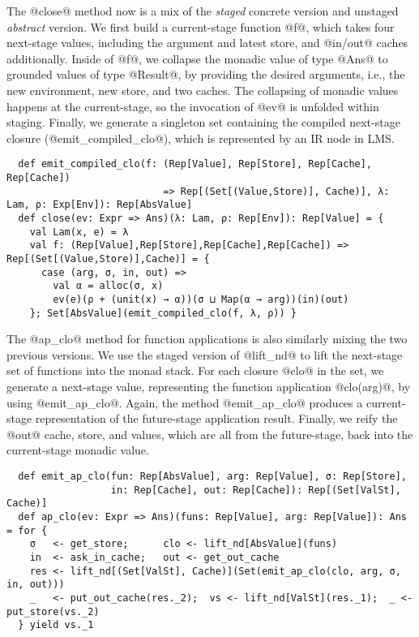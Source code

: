The @close@ method now is a mix of the \textit{staged} concrete version and
unstaged \textit{abstract} version. We first build a current-stage function @f@, which
takes four next-stage values, including the argument and latest store, and
@in/out@ caches additionally. Inside of @f@, we collapse the monadic value of
type @Ans@ to grounded values of type @Result@, by providing the desired
arguments, i.e., the new environment, new store, and two caches. The collapsing
of monadic values happens at the current-stage, so the invocation of @ev@ is unfolded
within staging. Finally, we generate a singleton set containing the compiled
next-stage closure (@emit_compiled_clo@), which is represented by an IR node
in LMS.
\begin{lstlisting}
  def emit_compiled_clo(f: (Rep[Value], Rep[Store], Rep[Cache], Rep[Cache])
                           => Rep[(Set[(Value,Store)], Cache)], λ: Lam, ρ: Exp[Env]): Rep[AbsValue]
  def close(ev: Expr => Ans)(λ: Lam, ρ: Rep[Env]): Rep[Value] = {
    val Lam(x, e) = λ
    val f: (Rep[Value],Rep[Store],Rep[Cache],Rep[Cache]) => Rep[(Set[(Value,Store)],Cache)] = {
      case (arg, σ, in, out) =>
        val α = alloc(σ, x)
        ev(e)(ρ + (unit(x) → α))(σ ⊔ Map(α → arg))(in)(out)
    }; Set[AbsValue](emit_compiled_clo(f, λ, ρ)) }
\end{lstlisting}

The @ap_clo@ method for function applications is also similarly mixing the two
previous versions.  We use the staged version of @lift_nd@ to lift the
next-stage set of functions into the monad stack.
For each closure @clo@ in the set, we generate a next-stage value, representing
the function application @clo(arg)@, by using @emit_ap_clo@.  Again, the method
@emit_ap_clo@ produces a current-stage representation of the future-stage
application result.  Finally, we reify the @out@ cache, store, and values,
which are all from the future-stage, back into the current-stage monadic value.
\begin{lstlisting}
  def emit_ap_clo(fun: Rep[AbsValue], arg: Rep[Value], σ: Rep[Store],
                  in: Rep[Cache], out: Rep[Cache]): Rep[(Set[ValSt], Cache)]
  def ap_clo(ev: Expr => Ans)(funs: Rep[Value], arg: Rep[Value]): Ans = for {
    σ   <- get_store;      clo <- lift_nd[AbsValue](funs)
    in  <- ask_in_cache;   out <- get_out_cache
    res <- lift_nd[(Set[ValSt], Cache)](Set(emit_ap_clo(clo, arg, σ, in, out)))
    _   <- put_out_cache(res._2);  vs <- lift_nd[ValSt](res._1);  _ <- put_store(vs._2)
  } yield vs._1
\end{lstlisting}

